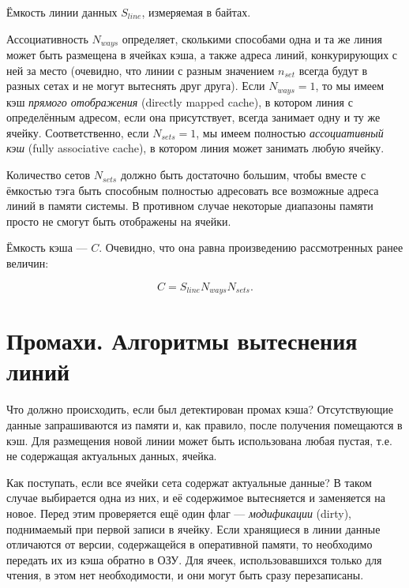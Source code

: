 \begin{itemize*}
\item Ёмкость линии данных $S_{line}$, измеряемая в байтах.
\item    Ассоциативность $N_{ways}$ определяет, сколькими способами одна и та же линия может быть размещена в ячейках кэша,  а также адреса линий, конкурирующих с ней за место (очевидно, что линии с разным значением $n_{set}$ всегда будут в разных сетах и не могут вытеснять друг друга). Если $N_{ways} = 1$, то мы имеем кэш \textit{прямого отображения} (\abbr directly mapped cache), в котором линия с определённым адресом, если она присутствует, всегда занимает одну и ту же ячейку. Соответственно, если $N_{sets} =1$, мы имеем полностью \textit{ассоциативный кэш} (\abbr fully associative cache), в котором линия может занимать любую ячейку.

\item    Количество сетов $N_{sets}$ должно быть достаточно большим, чтобы вместе с ёмкостью тэга быть способным полностью адресовать все возможные адреса линий в памяти системы. В противном случае некоторые диапазоны памяти просто не смогут быть отображены на ячейки.

\item    Ёмкость кэша --- $C$. Очевидно, что она равна произведению рассмотренных ранее величин:

$$C = S_{line}N_{ways} N_{sets}.$$
\end{itemize*}


\section{Промахи. Алгоритмы вытеснения линий}

Что должно происходить, если был детектирован промах кэша? Отсутствующие данные запрашиваются из памяти и, как правило, после получения помещаются в кэш. Для размещения новой линии может быть использована любая пустая, т.е. не содержащая актуальных данных, ячейка.

Как поступать, если все ячейки сета содержат актуальные данные? В таком случае выбирается одна из них, и её содержимое вытесняется и заменяется на новое. Перед этим проверяется ещё один флаг --- \textit{модификации} (\abbr dirty), поднимаемый при первой записи в ячейку. Если хранящиеся  в линии данные отличаются от версии, содержащейся в оперативной памяти, то необходимо передать их из кэша обратно в ОЗУ. Для ячеек, использовавшихся только для чтения, в этом нет необходимости, и они могут быть сразу перезаписаны.


